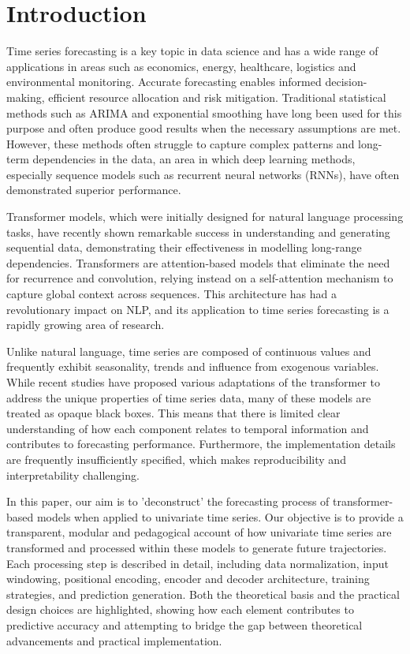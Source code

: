 \documentclass[algorithms,article,submit,pdftex,moreauthors]{Definitions/mdpi}
\begin{document}
\section{Introduction} \label{sec:intro}

Time series forecasting is a key topic in data science and has a wide range of applications in areas such as economics, energy, healthcare, logistics and environmental monitoring. Accurate forecasting enables informed decision-making, efficient resource allocation and risk mitigation. Traditional statistical methods such as ARIMA and exponential smoothing have long been used for this purpose and often produce good results when the necessary assumptions are met. However, these methods often struggle to capture complex patterns and long-term dependencies in the data, an area in which deep learning methods, especially sequence models such as recurrent neural networks (RNNs), have often demonstrated superior performance.

Transformer models, which were initially designed for natural language processing tasks, have recently shown remarkable success in understanding and generating sequential data, demonstrating their effectiveness in modelling long-range dependencies. Transformers are attention-based models that eliminate the need for recurrence and convolution, relying instead on a self-attention mechanism to capture global context across sequences. This architecture has had a revolutionary impact on NLP, and its application to time series forecasting is a rapidly growing area of research. 

Unlike natural language, time series are composed of continuous values and frequently exhibit seasonality, trends and influence from exogenous variables. While recent studies have proposed various adaptations of the transformer to address the unique properties of time series data, many of these models are treated as opaque black boxes. This means that there is limited clear understanding of how each component relates to temporal information and contributes to forecasting performance. Furthermore, the implementation details are frequently insufficiently specified, which makes reproducibility and interpretability challenging.

In this paper, our aim is to 'deconstruct' the forecasting process of transformer-based models when applied to univariate time series. Our objective is to provide a transparent, modular and pedagogical account of how univariate time series are transformed and processed within these models to generate future trajectories. Each processing step is described in detail, including data normalization, input windowing, positional encoding, encoder and decoder architecture, training strategies, and prediction generation. Both the theoretical basis and the practical design choices are highlighted, showing how each element contributes to predictive accuracy and attempting to bridge the gap between theoretical advancements and practical implementation.
\end{document}
